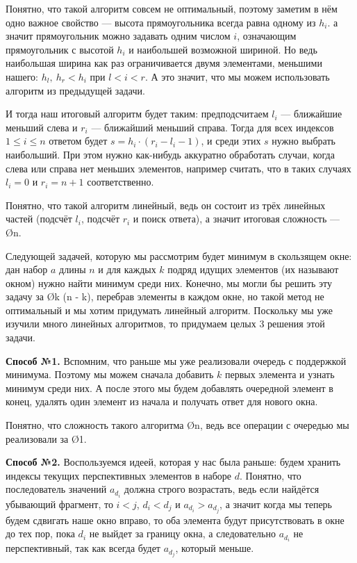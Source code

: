 Понятно, что такой алгоритм совсем не оптимальный, поэтому заметим в нём одно важное свойство — высота прямоугольника всегда равна одному из $h_i$. а значит прямоугольник можно задавать одним числом $i$, означающим прямоугольник с высотой $h_i$ и наибольшей возможной шириной. Но ведь наибольшая ширина как раз ограничивается двумя элементами, меньшими нашего: $h_l,\ h_r < h_i$ при $l < i < r$. А это значит, что мы можем использовать алгоритм из предыдущей задачи.

И тогда наш итоговый алгоритм будет таким: предподсчитаем $l_i$ — ближайшие меньший слева и $r_i$ — ближайший меньший справа. Тогда для всех индексов $1 \leq i \leq n$ ответом будет $s = h_i \cdot (r_i - l_i - 1)$, и среди этих $s$ нужно выбрать наибольший. При этом нужно как-нибудь аккуратно обработать случаи, когда слева или справа нет меньших элементов, например считать, что в таких случаях $l_i = 0$ и $r_i = n + 1$ соответственно.

Понятно, что такой алгоритм линейный, ведь он состоит из трёх линейных частей (подсчёт $l_i$, подсчёт $r_i$ и поиск ответа), а значит итоговая сложность — \O{n}.


Следующей задачей, которую мы рассмотрим будет минимум в скользящем окне: дан набор $a$ длины $n$ и для каждых $k$ подряд идущих элементов (их называют окном) нужно найти минимум среди них. Конечно, мы могли бы решить эту задачу за \O{k \cdot (n - k)}, перебрав элементы в каждом окне, но такой метод не оптимальный и мы хотим придумать линейный алгоритм. Поскольку мы уже изучили много линейных алгоритмов, то придумаем целых 3 решения этой задачи.

\textbf{Способ №1.} Вспомним, что раньше мы уже реализовали очередь с поддержкой минимума. Поэтому мы можем сначала добавить $k$ первых элемента и узнать минимум среди них. А после этого мы будем добавлять очередной элемент в конец, удалять один элемент из начала и получать ответ для нового окна.

Понятно, что сложность такого алгоритма \O{n}, ведь все операции с очередью мы реализовали за \O{1}.

\textbf{Способ №2.} Воспользуемся идеей, которая у нас была раньше: будем хранить индексы текущих перспективных элементов в наборе $d$. Понятно, что последователь значений $a_{d_i}$ должна строго возрастать, ведь если найдётся убывающий фрагмент, то $i < j$, $d_i < d_j$ и $a_{d_i} > a_{d_j}$, а значит когда мы теперь будем сдвигать наше окно вправо, то оба элемента будут присутствовать в окне до тех пор, пока $d_i$ не выйдет за границу окна, а следовательно $a_{d_i}$ не перспективный, так как всегда будет $a_{d_j}$, который меньше.

